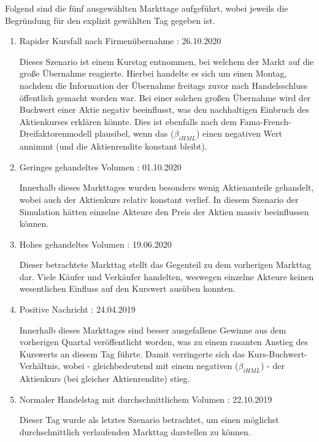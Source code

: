Folgend sind die fünf ausgewählten Markttage aufgeführt, wobei jeweils die Begründung für den explizit gewählten Tag gegeben ist.
\begin{enumerate}
	\item Rapider Kursfall nach Firmenübernahme : 26.10.2020
	
		Dieses Szenario ist einem Kurstag entnommen, bei welchem der Markt auf die große Übernahme reagierte. Hierbei handelte es sich um einen Montag, nachdem die Information der Übernahme freitags zuvor nach Handelsschluss öffentlich gemacht worden war. Bei einer solchen großen Übernahme wird der Buchwert einer Aktie negativ beeinflusst, was den nachhaltigen Einbruch des Aktienkurses erklären könnte. Dies ist ebenfalls nach dem Fama-French-Dreifaktorenmodell plausibel, wenn das ($\beta_{iHML}$) einen negativen Wert annimmt (und die Aktienrendite konstant bleibt).
	
	\item Geringes gehandeltes Volumen : 01.10.2020
	
		Innerhalb dieses Markttages wurden besonders wenig Aktienanteile gehandelt, wobei auch der Aktienkurs relativ konstant verlief. In diesem Szenario der Simulation hätten einzelne Akteure den Preis der Aktien massiv beeinflussen können.  
		
	\item Hohes gehandeltes Volumen : 19.06.2020
	
		Dieser betrachtete Markttag stellt das Gegenteil zu dem vorherigen Markttag dar. Viele Käufer und Verkäufer handelten, weswegen einzelne Akteure keinen wesentlichen Einfluss auf den Kurswert ausüben konnten.
	
	\item Positive Nachricht : 24.04.2019
	
		Innerhalb dieses Markttages sind besser ausgefallene Gewinne aus dem vorherigen Quartal veröffentlicht worden, was zu einem rasanten Anstieg des Kurswerts an diesem Tag führte. Damit verringerte sich das Kurs-Buchwert-Verhältnis, wobei - gleichbedeutend mit einem negativen ($\beta_{iHML}$) - der Aktienkurs (bei gleicher Aktienrendite) stieg.
	
	\item Normaler Handelstag mit durchschnittlichem Volumen : 22.10.2019
	
		Dieser Tag wurde als letztes Szenario betrachtet, um einen möglichst durchschnittlich verlaufenden Markttag darstellen zu können.
	
\end{enumerate}

